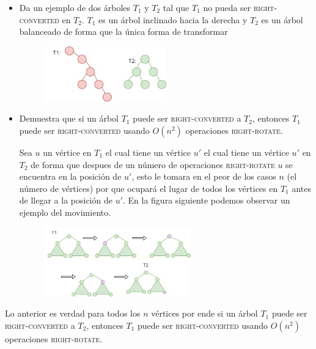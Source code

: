 \begin{itemize}
    \item Da un ejemplo de dos árboles $T_1$ y $T_2$ tal que  $T_1$ no pueda ser \textsc{right-converted} en $T_2$.
    $T_1$ es un árbol inclinado hacia la derecha y $T_2$ es un árbol balanceado de forma que la única forma de transformar 
    \begin{figure}[h!]
        \centering
        \includegraphics[width=0.5\textwidth ]{t1-1.jpg}
    \end{figure}
    
    
        
    \item Demuestra que si un árbol $T_1$ puede ser \textsc{right-converted} a $T_2$, entonces $T_1$ puede ser \textsc{right-converted} usando $O(n^2)$ operaciones \textsc{right-rotate}.
    
    Sea $u$ un vértice en $T_1$ el cual tiene un vértice $u'$ el cual tiene un vértice $u'$ en $T_2$ de forma que despues de un número de operaciones \textsc{right-rotate} $u$ se encuentra en la posición de $u'$, esto le tomara en el peor de los casos $n$ (el número de vértices) por que ocupará el lugar de todos los vértices en $T_1$ antes de llegar a la posición de $u'$. En la figura siguiente podemos observar un ejemplo del movimiento.
    \begin{figure}[h!]
        \centering
        \includegraphics[width=0.6\textwidth]{t1-2.jpg}

    \end{figure}
\end{itemize} 

Lo anterior es verdad para todos los $n$ vértices por ende si un árbol $T_1$ puede ser \textsc{right-converted} a $T_2$, entonces $T_1$ puede ser \textsc{right-converted} usando $O(n^2)$ operaciones \textsc{right-rotate}.

\bigskip

